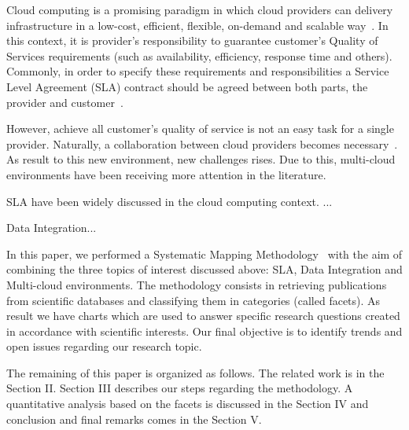 Cloud computing is a promising paradigm in which cloud providers can delivery infrastructure in 
a low-cost, efficient, flexible, on-demand and scalable way~\cite{014}.
In this context, it is provider's responsibility to guarantee customer's Quality of Services 
requirements (such as availability, efficiency, response time and others).
Commonly, in order to specify these requirements and responsibilities a Service Level Agreement (SLA)
contract should be agreed between both parts, the provider and customer~\cite{011}.

However, achieve all customer's quality of service is not an easy task for a single provider.
Naturally, a collaboration between cloud providers becomes necessary~\cite{036}.
As result to this new environment, new challenges rises.
Due to this, multi-cloud environments have been receiving more attention in the literature.

SLA have been widely discussed in the cloud computing context. ...

Data Integration...

In this paper, we performed a Systematic Mapping Methodology~\cite{SM:Petersen:2008} with the aim of
combining the three topics of interest discussed above: SLA, Data Integration and Multi-cloud environments.
The methodology consists in retrieving publications from scientific databases and classifying them in
categories (called facets). As result we have charts which are used to answer specific research questions
created in accordance with scientific interests. 
Our final objective is to identify trends and open issues regarding our research topic.

The remaining of this paper is organized as follows. 
The related work is in the Section II. 
Section III describes our steps regarding the methodology.
A quantitative analysis based on the facets is discussed in the Section IV and conclusion and final
remarks comes in the Section V.
